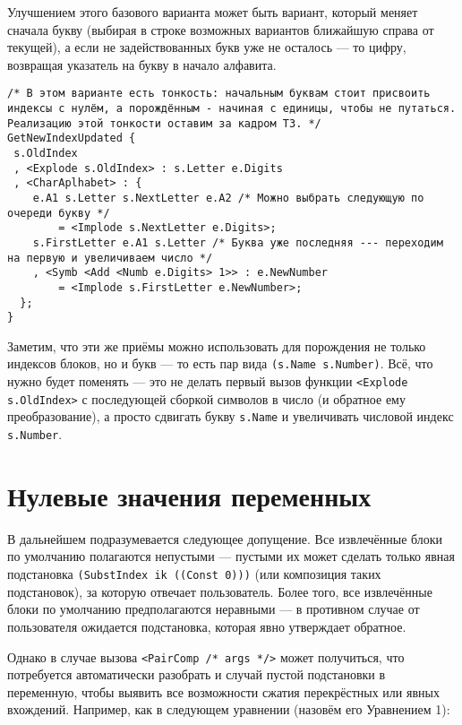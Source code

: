 \documentclass[12pt]{article}
\begin{document}
Улучшением этого базового варианта может быть вариант, который меняет сначала букву (выбирая в строке возможных вариантов ближайшую справа от текущей), а если не задействованных букв уже не осталось --- то цифру, возвращая указатель на букву в начало алфавита.

\begin{verbatim}
/* В этом варианте есть тонкость: начальным буквам стоит присвоить индексы с нулём, а порождённым - начиная с единицы, чтобы не путаться. Реализацию этой тонкости оставим за кадром ТЗ. */
GetNewIndexUpdated {
 s.OldIndex
 , <Explode s.OldIndex> : s.Letter e.Digits
 , <CharAplhabet> : {
    e.A1 s.Letter s.NextLetter e.A2 /* Можно выбрать следующую по очереди букву */
        = <Implode s.NextLetter e.Digits>;
    s.FirstLetter e.A1 s.Letter /* Буква уже последняя --- переходим на первую и увеличиваем число */
    , <Symb <Add <Numb e.Digits> 1>> : e.NewNumber
        = <Implode s.FirstLetter e.NewNumber>;
  };
}
\end{verbatim}

Заметим, что эти же приёмы можно использовать для порождения не только индексов блоков, но и букв --- то есть пар вида \texttt{(s.Name s.Number)}. Всё, что нужно будет поменять --- это не делать первый вызов функции \texttt{<Explode s.OldIndex>} с последующей сборкой символов в число (и обратное ему преобразование), а просто сдвигать букву \texttt{s.Name} и увеличивать числовой индекс \texttt{s.Number}.
 
\section{Нулевые значения переменных}
 
В дальнейшем подразумевается следующее допущение. Все извлечённые блоки по умолчанию полагаются непустыми --- пустыми их может сделать только явная подстановка \texttt{(SubstIndex ik ((Const 0)))} (или композиция таких подстановок), за которую отвечает пользователь. Более того, все извлечённые блоки по умолчанию предполагаются неравными --- в противном случае от пользователя ожидается подстановка, которая явно утверждает обратное.

Однако в случае вызова \texttt{<PairComp /* args */>} может получиться, что потребуется автоматически разобрать и случай пустой подстановки в переменную, чтобы выявить все возможности сжатия перекрёстных или явных вхождений. Например, как в следующем уравнении (назовём его Уравнением 1): 
\end{document}
